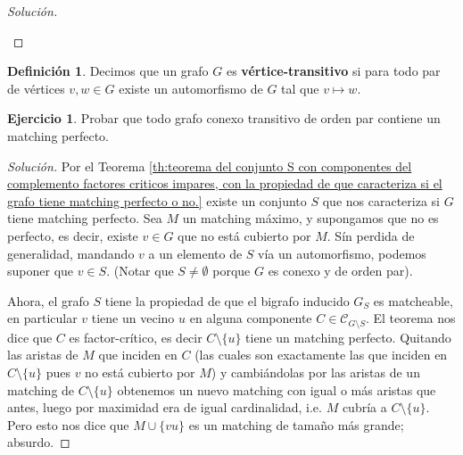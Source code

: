 \documentclass[12pt]{report}
\theoremstyle{plain}
\theoremstyle{definition}
\newtheorem{definition}[theorem]{Definición}
\newtheorem{exercise}[theorem]{Ejercicio}
\newenvironment{solution}{\begin{proof}[Solución]}{\end{proof}}
\begin{document}
\begin{solution}
\begin{enumerate}[(a)]
\end{enumerate}
\end{solution}


\begin{definition}
Decimos que un grafo $G$ es \textbf{vértice-transitivo} si para todo par de vértices $v,w\in G$ existe un automorfismo de $G$ tal que $v \mapsto w$.
\end{definition}

\begin{exercise}
Probar que todo grafo conexo transitivo de orden par contiene un matching perfecto.
\end{exercise}
\begin{solution}
Por el Teorema \ref{th:teorema del conjunto S con componentes del complemento factores criticos impares, con la propiedad de que caracteriza si el grafo tiene matching perfecto o no.} existe un conjunto $S$ que nos caracteriza si $G$ tiene matching perfecto. Sea $M$ un matching máximo, y supongamos que no es perfecto, es decir, existe $v \in G$ que no está cubierto por $M$. Sín perdida de generalidad, mandando $v$ a un elemento de $S$ vía un automorfismo, podemos suponer que $v \in S$. (Notar que $S \neq \emptyset$ porque $G$ es conexo y de orden par).

Ahora, el grafo $S$ tiene la propiedad de que el bigrafo inducido $G_S$ es matcheable, en particular $v$ tiene un vecino $u$ en alguna componente $C \in \mathcal C _{G \setminus S}$. El teorema nos dice que $C$ es factor-crítico, es decir $C \setminus \{u\}$ tiene un matching perfecto. Quitando las aristas de $M$ que inciden en $C$ (las cuales son exactamente las que inciden en $C \setminus \{u\}$ pues $v$ no está cubierto por $M$) y cambiándolas por las aristas de un matching de $C \setminus \{u\}$ obtenemos un nuevo matching con igual o más aristas que antes, luego por maximidad era de igual cardinalidad, i.e. $M$ cubría a $C \setminus \{u\}$. Pero esto nos dice que $M \cup \{ v u \}$ es un matching de tamaño más grande; absurdo.
\end{solution}
\end{document}
